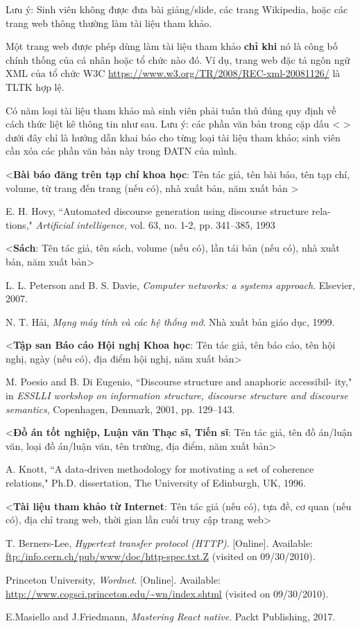 \documentclass[../DoAn.tex]{subfiles}
\begin{document}
Lưu ý: Sinh viên không được đưa bài giảng/slide, các trang Wikipedia, hoặc các trang web thông thường làm tài liệu tham khảo. 

Một trang web được phép dùng làm tài liệu tham khảo \textbf{chỉ khi} nó là công bố chính thống của cá nhân hoặc tổ chức nào đó. Ví dụ, trang web đặc tả ngôn ngữ XML của tổ chức W3C \url{https://www.w3.org/TR/2008/REC-xml-20081126/} là TLTK hợp lệ.

Có năm loại tài liệu tham khảo mà sinh viên phải tuân thủ đúng quy định về cách thức liệt kê thông tin như sau. Lưu ý: các phần văn bản trong cặp dấu < > dưới đây chỉ là hướng dẫn khai báo cho từng loại tài liệu tham khảo; sinh viên cần xóa các phần văn bản này trong ĐATN của mình.

<\textbf{Bài báo đăng trên tạp chí khoa học}: Tên tác giả, tên bài báo, tên tạp chí, volume, từ trang đến trang (nếu có), nhà xuất bản, năm xuất bản >



\cite{hovy1993automated} E. H. Hovy, ``Automated discourse generation using discourse structure rela-
tions," \textit{Artificial intelligence}, vol. 63, no. 1-2, pp. 341–385, 1993

<\textbf{Sách}: Tên tác giả, tên sách, volume (nếu có), lần tái bản (nếu có), nhà xuất bản, năm xuất bản>

\cite{peterson2007computer}	L. L. Peterson and B. S. Davie, \textit{Computer networks: a systems approach}. Elsevier, 2007.

\cite{NguyenThucHai}	N. T. Hải, \textit{Mạng máy tính và các hệ thống mở}. Nhà xuất bản giáo dục, 1999. 

<\textbf{Tập san Báo cáo Hội nghị Khoa học}: Tên tác giả, tên báo cáo, tên hội nghị, ngày (nếu có), địa điểm hội nghị, năm xuất bản>

\cite{poesio2001discourse}	M. Poesio and B. Di Eugenio, ``Discourse structure and anaphoric accessibil-
ity," in \textit{ESSLLI workshop on information structure, discourse structure and
discourse semantics}, Copenhagen, Denmark, 2001, pp. 129–143.

<\textbf{Đồ án tốt nghiệp, Luận văn Thạc sĩ, Tiến sĩ}: Tên tác giả, tên đồ án/luận văn, loại đồ án/luận văn, tên trường, địa điểm, năm xuất bản>

\cite{knott1996data}	A. Knott, ``A data-driven methodology for motivating a set of coherence relations," Ph.D. dissertation, The University of Edinburgh, UK, 1996.

<\textbf{Tài liệu tham khảo từ Internet}: Tên tác giả (nếu có), tựa đề, cơ quan (nếu có), địa chỉ trang web, thời gian lần cuối truy cập trang web>

\cite{BernersTim}	T. Berners-Lee, \textit{Hypertext transfer protocol (HTTP)}. [Online]. Available: \url{ftp:/info.cern.ch/pub/www/doc/http-spec.txt.Z} (visited on
09/30/2010).

\cite{LectureA} Princeton University, \textit{Wordnet}. [Online]. Available: \url{http://www.cogsci.princeton.edu/~wn/index.shtml} (visited on 09/30/2010).

\cite{ReactNative} E.Masiello and J.Friedmann, \textit{Mastering React native}. Packt Publishing, 2017.
\end{document}

